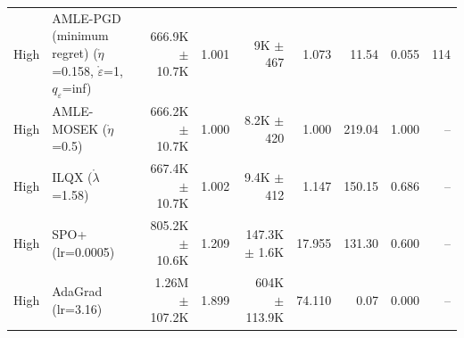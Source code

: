 \begin{tabular}{llrrrrrrr}
High & AMLE-PGD (minimum regret) ($\mathring{\eta}$=0.158, $\mathring{\varepsilon}$=1, $q_\varepsilon$=inf) & 666.9K $\pm$ 10.7K & 1.001 & 9K $\pm$ 467 & 1.073 & 11.54 & 0.055 & 114 \\
High & AMLE-MOSEK ($\mathring{\eta}$=0.5) & 666.2K $\pm$ 10.7K & 1.000 & 8.2K $\pm$ 420 & 1.000 & 219.04 & 1.000 & -- \\
High & ILQX ($\mathring{\lambda}$=1.58) & 667.4K $\pm$ 10.7K & 1.002 & 9.4K $\pm$ 412 & 1.147 & 150.15 & 0.686 & -- \\
High & SPO+ (lr=0.0005) & 805.2K $\pm$ 10.6K & 1.209 & 147.3K $\pm$ 1.6K & 17.955 & 131.30 & 0.600 & -- \\
High & AdaGrad (lr=3.16) & 1.26M $\pm$ 107.2K & 1.899 & 604K $\pm$ 113.9K & 74.110 & 0.07 & 0.000 & -- \\
\bottomrule
\end{tabular}
